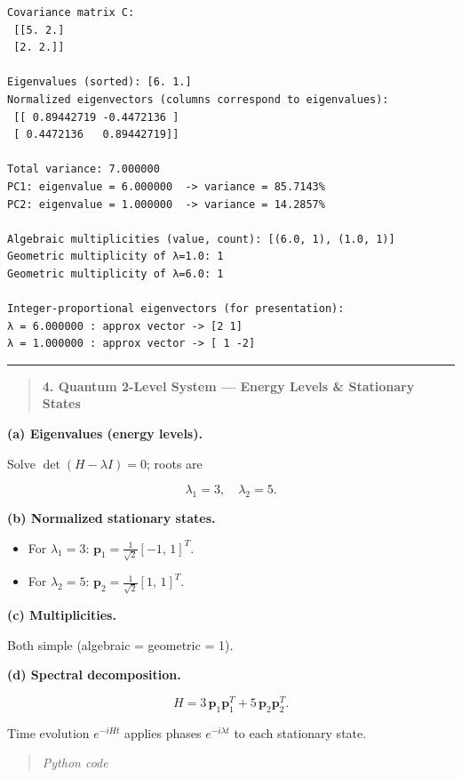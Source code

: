 \documentclass[
  letterpaper,
  DIV=11,
  numbers=noendperiod]{scrreprt}
\providecommand{\tightlist}{%
  \setlength{\itemsep}{0pt}\setlength{\parskip}{0pt}}
\begin{document}
\begin{verbatim}
Covariance matrix C:
 [[5. 2.]
 [2. 2.]]

Eigenvalues (sorted): [6. 1.]
Normalized eigenvectors (columns correspond to eigenvalues):
 [[ 0.89442719 -0.4472136 ]
 [ 0.4472136   0.89442719]]

Total variance: 7.000000
PC1: eigenvalue = 6.000000  -> variance = 85.7143%
PC2: eigenvalue = 1.000000  -> variance = 14.2857%

Algebraic multiplicities (value, count): [(6.0, 1), (1.0, 1)]
Geometric multiplicity of λ=1.0: 1
Geometric multiplicity of λ=6.0: 1

Integer-proportional eigenvectors (for presentation):
λ = 6.000000 : approx vector -> [2 1]
λ = 1.000000 : approx vector -> [ 1 -2]
\end{verbatim}

\begin{center}\rule{0.5\linewidth}{0.5pt}\end{center}

\begin{quote}
\textbf{4. Quantum 2-Level System --- Energy Levels \& Stationary
States}
\end{quote}

\textbf{(a) Eigenvalues (energy levels).}

Solve \(\det(H-\lambda I)=0\); roots are

\[\lambda_1 = 3,\quad \lambda_2 = 5.\]

\textbf{(b) Normalized stationary states.}

\begin{itemize}
\tightlist
\item
  For \(\lambda_1=3\): \(\mathbf p_1 = \tfrac{1}{\sqrt{2}}[-1,\,1]^T\).
\item
  For \(\lambda_2=5\): \(\mathbf p_2 = \tfrac{1}{\sqrt{2}}[1,\,1]^T\).
\end{itemize}

\textbf{(c) Multiplicities.}

Both simple (algebraic = geometric = 1).

\textbf{(d) Spectral decomposition.}

\[H = 3\,\mathbf p_1\mathbf p_1^T + 5\,\mathbf p_2\mathbf p_2^T.\]

Time evolution \(e^{-iHt}\) applies phases \(e^{-i\lambda t}\) to each
stationary state.

\begin{quote}
\emph{Python code}
\end{quote}
\end{document}
